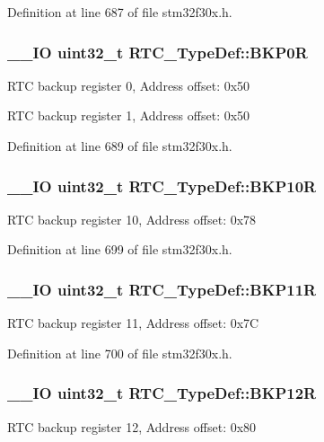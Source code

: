 Definition at line 687 of file stm32f30x.\-h.

\hypertarget{struct_r_t_c___type_def_ab32c76ca1f3bd0f0f46d42c2dfa74524}{
\subsubsection[{B\-K\-P0\-R}]{\setlength{\rightskip}{0pt plus 5cm}\-\_\-\-\_\-\-I\-O {\bf uint32\-\_\-t} R\-T\-C\-\_\-\-Type\-Def\-::\-B\-K\-P0\-R}}\label{struct_r_t_c___type_def_ab32c76ca1f3bd0f0f46d42c2dfa74524}
R\-T\-C backup register 0, Address offset\-: 0x50

R\-T\-C backup register 1, Address offset\-: 0x50 

Definition at line 689 of file stm32f30x.\-h.

\hypertarget{struct_r_t_c___type_def_a5feba3d5adae3f234b3d172459163c5a}{
\subsubsection[{B\-K\-P10\-R}]{\setlength{\rightskip}{0pt plus 5cm}\-\_\-\-\_\-\-I\-O {\bf uint32\-\_\-t} R\-T\-C\-\_\-\-Type\-Def\-::\-B\-K\-P10\-R}}\label{struct_r_t_c___type_def_a5feba3d5adae3f234b3d172459163c5a}
R\-T\-C backup register 10, Address offset\-: 0x78 

Definition at line 699 of file stm32f30x.\-h.

\hypertarget{struct_r_t_c___type_def_a8fef38e1e122778601e18f5b757c037a}{
\subsubsection[{B\-K\-P11\-R}]{\setlength{\rightskip}{0pt plus 5cm}\-\_\-\-\_\-\-I\-O {\bf uint32\-\_\-t} R\-T\-C\-\_\-\-Type\-Def\-::\-B\-K\-P11\-R}}\label{struct_r_t_c___type_def_a8fef38e1e122778601e18f5b757c037a}
R\-T\-C backup register 11, Address offset\-: 0x7\-C 

Definition at line 700 of file stm32f30x.\-h.

\hypertarget{struct_r_t_c___type_def_a6606b5d249f923aa15ab74b382cbaf7e}{
\subsubsection[{B\-K\-P12\-R}]{\setlength{\rightskip}{0pt plus 5cm}\-\_\-\-\_\-\-I\-O {\bf uint32\-\_\-t} R\-T\-C\-\_\-\-Type\-Def\-::\-B\-K\-P12\-R}}\label{struct_r_t_c___type_def_a6606b5d249f923aa15ab74b382cbaf7e}
R\-T\-C backup register 12, Address offset\-: 0x80 

